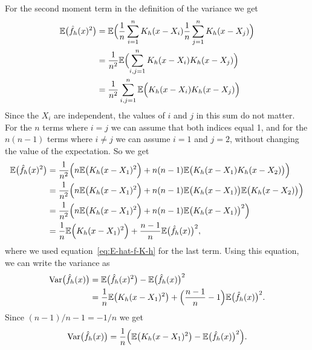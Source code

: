 \documentclass[
  a4paper,
]{article}
\theoremstyle{definition}
\theoremstyle{definition}
\theoremstyle{definition}
\theoremstyle{definition}
\theoremstyle{remark}
\begin{document}
For the second moment term in the definition of the variance we get
\begin{align*}
  \mathbb{E}\bigl( \hat f_h(x)^2 \bigr)
  &= \mathbb{E}\Bigl( \frac{1}{n} \sum_{i=1}^n K_h(x - X_i) \frac{1}{n} \sum_{j=1}^n K_h(x - X_j) \Bigr) \\
  &= \frac{1}{n^2} \mathbb{E}\Bigl( \sum_{i,j=1}^n K_h(x - X_i) K_h(x - X_j) \Bigr) \\
  &= \frac{1}{n^2} \sum_{i,j=1}^n \mathbb{E}\Bigl( K_h(x - X_i) K_h(x - X_j) \Bigr)
\end{align*}
Since the \(X_i\) are independent, the values of \(i\) and \(j\) in this sum do not
matter. For the \(n\) terms where \(i=j\) we can assume that both indices equal
1, and for the \(n(n-1)\) terms where \(i\neq j\) we can assume \(i=1\) and \(j=2\),
without changing the value of the expectation. So we get
\begin{align*}
  \mathbb{E}\bigl( \hat f_h(x)^2 \bigr)
  &= \frac{1}{n^2} \Bigl( n \mathbb{E}\bigl( K_h(x - X_1)^2 \Bigr) + n(n-1) \mathbb{E}\bigl( K_h(x - X_1) K_h(x - X_2) \bigr) \Bigr) \\
  &= \frac{1}{n^2} \Bigl( n \mathbb{E}\bigl( K_h(x - X_1)^2 \Bigr) + n(n-1) \mathbb{E}\bigl( K_h(x - X_1) \bigr) \mathbb{E}\bigl( K_h(x - X_2) \bigr) \Bigr) \\
  &= \frac{1}{n^2} \Bigl( n \mathbb{E}\bigl( K_h(x - X_1)^2 \Bigr) + n(n-1) \mathbb{E}\bigl( K_h(x - X_1) \bigr)^2 \Bigr) \\
  &= \frac{1}{n} \mathbb{E}\Bigl( K_h(x - X_1)^2 \Bigr) + \frac{n-1}{n} \mathbb{E}\bigl( \hat f_h(x) \bigr)^2,
\end{align*}
where we used equation~\eqref{eq:E-hat-f-K-h} for the last term.
Using this equation, we can write the variance as
\begin{align*}
  \mathop{\mathrm{Var}}\bigl( \hat f_h(x) \bigr)
  &= \mathbb{E}\bigl( \hat f_h(x)^2 \bigr) - \mathbb{E}\bigl( \hat f_h(x) \bigr)^2 \\
  &= \frac{1}{n} \mathbb{E}\bigl( K_h(x - X_1)^2 \bigr) + \Bigl(\frac{n-1}{n} - 1\Bigr) \mathbb{E}\bigl( \hat f_h(x) \bigr)^2.
\end{align*}
Since \((n-1)/n - 1 = -1/n\) we get
\begin{equation}
  \mathop{\mathrm{Var}}\bigl( \hat f_h(x) \bigr)
  = \frac{1}{n} \Bigl( \mathbb{E}\bigl( K_h(x - X_1)^2 \bigr) - \mathbb{E}\bigl( \hat f_h(x) \bigr)^2 \Bigr).
                                                          \label{eq:Var-hat-f-2}
\end{equation}
\end{document}
